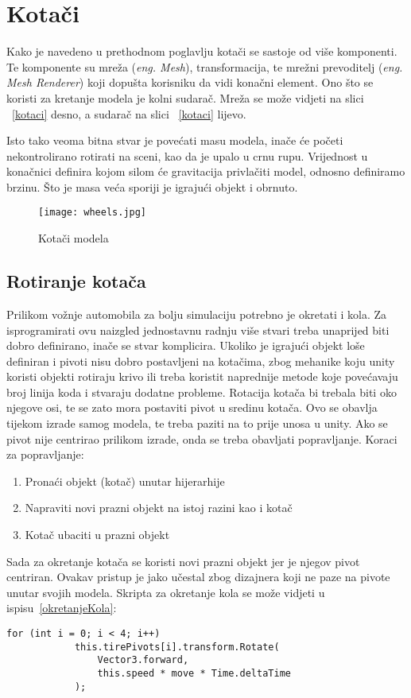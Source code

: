 \section{Kotači}
Kako je navedeno u prethodnom poglavlju kotači se sastoje od više komponenti. Te komponente su mreža (\emph{eng. Mesh}), transformacija, te mrežni prevoditelj (\emph{eng. Mesh Renderer}) koji dopušta korisniku da vidi konačni element. Ono što se koristi za kretanje modela je kolni sudarač. Mreža se može vidjeti na slici ~\ref{kotaci} desno, a sudarač na slici ~\ref{kotaci} lijevo. \par
Isto tako veoma bitna stvar je povećati masu modela, inače će početi nekontrolirano rotirati na sceni, kao da je upalo u crnu rupu. Vrijednost u konačnici definira kojom silom će gravitacija privlačiti model, odnosno definiramo brzinu. Što je masa veća sporiji je igrajući objekt i obrnuto.

\begin{figure}[h]
	\texttt{[image: wheels.jpg]}
	\centering
	\caption{Kotači modela}
	\label{fig:kotaci}
\end{figure}

\subsection{Rotiranje kotača}
Prilikom vožnje automobila za bolju simulaciju potrebno je okretati i kola. Za isprogramirati ovu naizgled jednostavnu radnju više stvari treba unaprijed biti dobro definirano, inače se stvar komplicira. Ukoliko je igrajući objekt loše definiran i pivoti nisu dobro postavljeni na kotačima, zbog mehanike koju unity koristi objekti rotiraju krivo ili treba koristit naprednije metode koje povećavaju broj linija koda i stvaraju dodatne probleme. Rotacija kotača bi trebala biti oko njegove osi, te se zato mora postaviti pivot u sredinu kotača. Ovo se obavlja tijekom izrade samog modela, te treba paziti na to prije unosa u unity. Ako se pivot nije centrirao prilikom izrade, onda se treba obavljati popravljanje. Koraci za popravljanje:
\begin{enumerate}
	\item Pronaći objekt (kotač) unutar hijerarhije
	\item Napraviti novi prazni objekt na istoj razini kao i kotač
	\item Kotač ubaciti u prazni objekt
\end{enumerate}
Sada za okretanje kotača se koristi novi prazni objekt jer je njegov pivot centriran. Ovakav pristup je jako učestal zbog dizajnera koji ne paze na pivote unutar svojih modela. Skripta za okretanje kola se može vidjeti u ispisu~\ref{okretanjeKola}:
\begin{lstlisting}[caption={Skripta za okretanje kola}, label=okretanjeKola]
for (int i = 0; i < 4; i++) 
			this.tirePivots[i].transform.Rotate(
			    Vector3.forward, 
			    this.speed * move * Time.deltaTime
			);	
\end{lstlisting}
